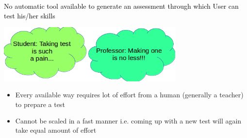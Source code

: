 \documentclass[sansserif,mathserif]{beamer}
\renewcommand{\subtitle}[1]{\vspace{6mm}{\large \bf \color{subtitlecolor} #1}}
\begin{document}
\begin{frame}
\frametitle{
\color{white}{\Huge \bf Automatic Assessment Generation via Machine Learning\\[0.3cm]}
\color{white}{\Large Arjun Jauhari, Advised by Igor Labutov, and Christoph Studer \\}
}

\vspace{4.0cm}


\vspace{-0.2cm}

\begin{columns}

\begin{column}{0.309\textwidth}

\vspace{-1.5cm}
\subtitle{The Problem}
\vspace{0.1cm}

\begin{exampleblock}{\vspace{-.4cm}\begin{center}\textcolor{black}{No automatic tool available to generate an assessment through which User can test his/her skills}\end{center}\vspace{-.2cm}}
\vspace{-0.2cm}
\end{exampleblock}

\vspace{-0.3cm}
\begin{center}
\includegraphics[width=0.7\textwidth]{fun.png} 
\vspace{-0.7cm}
\end{center}


\begin{itemize}
    \item Every available way requires lot of effort from a human (generally a teacher) to prepare a test
\item Cannot be scaled in a fast manner i.e. coming up with a new test will again take equal amount of effort
\\[0.1cm]
\end{itemize}



\end{column}
\end{columns}
\end{frame}
\end{document}
